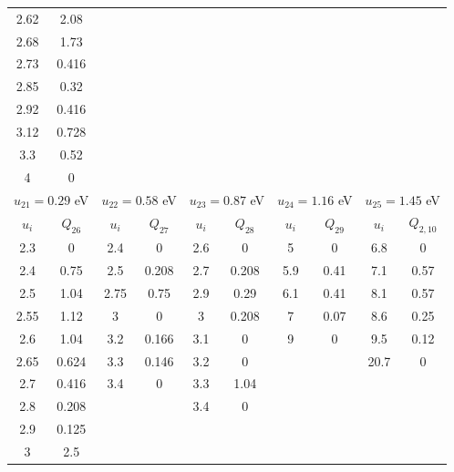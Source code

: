 \documentclass{report}
\begin{document}
\begin{appendices}
\begin{table}
\begin{tabular}{|c|c||c|c||c|c||c|c||c|c|}
2.62 & 2.08   &       &       &      &       &      &       &      &       \\ 
2.68 & 1.73   &       &       &      &       &      &       &      &       \\ 
2.73 & 0.416  &       &       &      &       &      &       &      &       \\ 
2.85 & 0.32   &       &       &      &       &      &       &      &       \\ 
2.92 & 0.416  &       &       &      &       &      &       &      &       \\ 
3.12 & 0.728  &       &       &      &       &      &       &      &       \\ 
3.3  & 0.52   &       &       &      &       &      &       &      &       \\ 
4    & 0      &       &       &      &       &      &       &      &       \\ 
\multicolumn{2}{|c||}{$u_{21}=0.29$ eV} &
\multicolumn{2}{c||}{$u_{22}=0.58$ eV} &
\multicolumn{2}{c||}{$u_{23}=0.87$ eV} &
\multicolumn{2}{c||}{$u_{24}=1.16$ eV} &
\multicolumn{2}{c|}{$u_{25}=1.45$ eV}\\
\hline
\hline 
$u_i$ & $Q_{26}$ & $u_i$ & $Q_{27}$ & $u_i$ & $Q_{28}$ & $u_i$ & $Q_{29}$ & $u_i$ & $Q_{2,10}$ \\                                                                             
\hline
2.3  & 0      & 2.4   & 0     & 2.6   & 0     & 5    & 0    & 6.8  & 0     \\
2.4  & 0.75   & 2.5   & 0.208 & 2.7   & 0.208 & 5.9  & 0.41 & 7.1  & 0.57  \\
2.5  & 1.04   & 2.75  & 0.75  & 2.9   & 0.29  & 6.1  & 0.41 & 8.1  & 0.57  \\
2.55 & 1.12   & 3     & 0     & 3     & 0.208 & 7    & 0.07 & 8.6  & 0.25  \\
2.6  & 1.04   & 3.2   & 0.166 & 3.1   & 0     & 9    & 0    & 9.5  & 0.12  \\
2.65 & 0.624  & 3.3   & 0.146 & 3.2   & 0     &      &      & 20.7 & 0     \\
2.7  & 0.416  & 3.4   & 0     & 3.3   & 1.04  &      &      &      &       \\
2.8  & 0.208  &       &       & 3.4   & 0     &      &      &      &       \\
2.9  & 0.125  &       &       &       &       &      &      &      &       \\
3    & 2.5    &       &       &       &       &      &      &      &       \\

\end{tabular}
\end{table}
\end{appendices}
\end{document}
